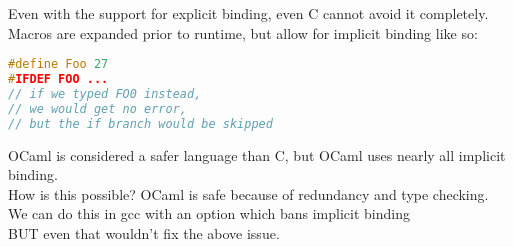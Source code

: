 \documentclass[../../lecture_notes.tex]{subfiles}
\begin{document}
Even with the support for explicit binding, even C cannot avoid it completely.\\
Macros are expanded prior to runtime, but allow for implicit binding like so:
\begin{lstlisting}[language=C++]
#define Foo 27
#IFDEF FOO ...
// if we typed FO0 instead, 
// we would get no error, 
// but the if branch would be skipped
\end{lstlisting}
OCaml is considered a safer language than C, but OCaml uses nearly all implicit binding.\\
How is this possible?  OCaml is safe because of redundancy and type checking.\\
We can do this in gcc with an option which bans implicit binding \\
\indent BUT even that wouldn't fix the above issue.\\
\end{document}
